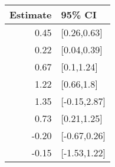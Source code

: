 \begin{tabular}{rl}
  \hline
Estimate & 95\% CI \\ 
  \hline
0.45 & [0.26,0.63] \\ 
  0.22 & [0.04,0.39] \\ 
  0.67 & [0.1,1.24] \\ 
  1.22 & [0.66,1.8] \\ 
  1.35 & [-0.15,2.87] \\ 
  0.73 & [0.21,1.25] \\ 
  -0.20 & [-0.67,0.26] \\ 
  -0.15 & [-1.53,1.22] \\ 
   \hline
\end{tabular}

